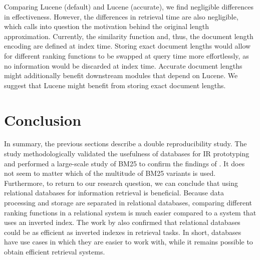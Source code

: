 Comparing Lucene (default) and Lucene (accurate), we find negligible differences in effectiveness. However, the differences in retrieval time are also negligible, which calls into question the motivation behind the original length approximation. Currently, the similarity function and, thus, the document length encoding are defined at index time. Storing exact document lengths would allow for different ranking functions to be swapped at query time more effortlessly, as no information would be discarded at index time. Accurate document lengths might additionally benefit downstream modules that depend on Lucene. We suggest that Lucene might benefit from storing exact document lengths.

\section{Conclusion}
In summary, the previous sections describe a double reproducibility study. The study methodologically validated the usefulness of databases for IR prototyping and performed a large-scale study of BM25 to confirm the findings of \citet{trotman-bm25}. It does not seem to matter which of the multitude of BM25 variants is used.
Furthermore, to return to our research question, we can conclude that using relational databases for information retrieval is beneficial. Because data processing and storage are separated in relational databases, comparing different ranking functions in a relational system is much easier compared to a system that uses an inverted index. The work by \cite{OldDog} also confirmed that relational databases could be as efficient as inverted indexes in retrieval tasks. In short, databases have use cases in which they are easier to work with, while it remains possible to obtain efficient retrieval systems.
